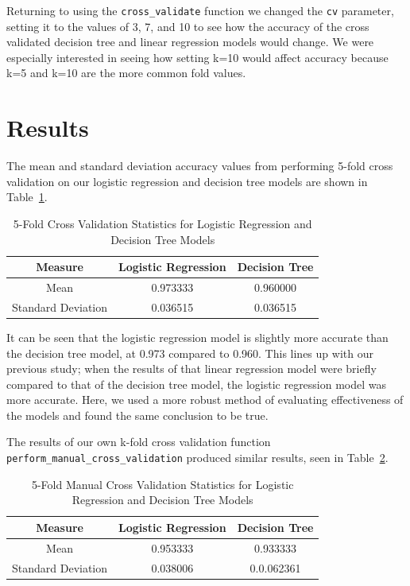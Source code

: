 \documentclass[journal]{IEEEtran}
\begin{document}
Returning to using the \lstinline{cross_validate} function we changed the \lstinline{cv} parameter, setting it to the values of 3, 7, and 10 to see how the accuracy of the cross validated decision tree and linear regression models would change. We were especially interested in seeing how setting k=10 would affect accuracy because k=5 and k=10 are the more common fold values.


\section{Results}
\label{sec:results}

The mean and standard deviation accuracy values from performing 5-fold cross validation on our logistic regression and decision tree models are shown in Table~\ref{table:5FoldCV}.

\begin{table}[h!]
\centering
\begin{tabular}{ c | c c }
Measure & Logistic Regression & Decision Tree \\
\hline
Mean & 0.973333 & 0.960000 \\
Standard Deviation & 0.036515 & 0.036515 \\
\end{tabular}
\caption{5-Fold Cross Validation Statistics for Logistic Regression and Decision Tree Models}
\label{table:5FoldCV}
\end{table}

It can be seen that the logistic regression model is slightly more accurate than the decision tree model, at 0.973 compared to 0.960. This lines up with our previous study; when the results of that linear regression model were briefly compared to that of the decision tree model, the logistic regression model was more accurate. Here, we used a more robust method of evaluating effectiveness of the models and found the same conclusion to be true.

The results of our own k-fold cross validation function \lstinline{perform_manual_cross_validation} produced similar results, seen in Table~\ref{table:5FoldManualCV}. 

\begin{table}[h!]
\centering
\begin{tabular}{ c | c c }
Measure & Logistic Regression & Decision Tree \\
\hline
Mean & 0.953333 & 0.933333 \\
Standard Deviation & 0.038006 & 0.0.062361 \\
\end{tabular}
\caption{5-Fold Manual Cross Validation Statistics for Logistic Regression and Decision Tree Models}
\label{table:5FoldManualCV}
\end{table}
\end{document}

